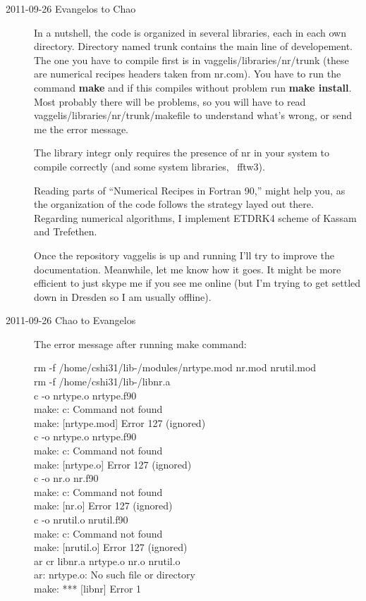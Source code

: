 \begin{description}
\item[2011-09-26 Evangelos to Chao] In a nutshell, the code is organized in
several libraries, each in each own directory. Directory named trunk contains
the main line of developement. The one you have to compile first is in
vaggelis/libraries/nr/trunk (these are numerical recipes headers taken from
nr.com). You have to run the command \textbf{make} and if this compiles without
problem run \textbf{make install}. Most probably there will be problems, so you
will have to read vaggelis/libraries/nr/trunk/makefile to understand what's
wrong, or send me the error message.

The library integr only requires the presence of nr in your system to compile
correctly (and some system libraries, \eg\ fftw3).

Reading  parts of ``Numerical Recipes in Fortran 90,'' might help you,
as the organization of the code follows the strategy layed out there.
Regarding numerical algorithms, I implement ETDRK4 scheme of Kassam and
Trefethen.

Once the repository vaggelis is up and running I'll try to improve the
documentation. Meanwhile, let me know how it goes. It might be more efficient
to just skype me if you see me online (but I'm trying to get settled down in
Dresden so I am usually offline).

\item[2011-09-26 Chao to Evangelos] The error message after running make command:

rm -f /home/cshi31/lib-/modules/nrtype.mod nr.mod nrutil.mod\\
rm -f /home/cshi31/lib-/libnr.a\\
c  -o nrtype.o  nrtype.f90 \\
make: c: Command not found\\
make: [nrtype.mod] Error 127 (ignored)\\
c  -o nrtype.o  nrtype.f90 \\
make: c: Command not found\\
make: [nrtype.o] Error 127 (ignored)\\
c  -o nr.o  nr.f90 \\
make: c: Command not found\\
make: [nr.o] Error 127 (ignored)\\
c  -o nrutil.o  nrutil.f90 \\
make: c: Command not found\\
make: [nrutil.o] Error 127 (ignored)\\
ar cr libnr.a nrtype.o nr.o nrutil.o \\
ar: nrtype.o: No such file or directory\\
make: *** [libnr] Error 1\\


\end{description}
